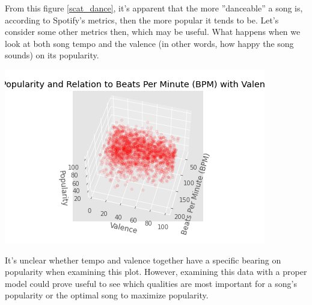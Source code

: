 \documentclass[11pt]{article}
\begin{document}
	From this figure \ref{scat_dance}, it's apparent that the more ''danceable'' a song is, according to Spotify's metrics, then the more popular it tends to be. Let's consider some other metrics then, which may be useful. What happens when we look at both song tempo and the valence (in other words, how happy the song sounds) on its popularity.
	
	\begin{center}
		\includegraphics[scale=1]{3dplot}\label{3d}
	\end{center}
	
	It's unclear whether tempo and valence together have a specific bearing on popularity when examining this plot. However, examining this data with a proper model could prove useful to see which qualities are most important for a song's popularity or the optimal song to maximize popularity.
	
\end{document}
